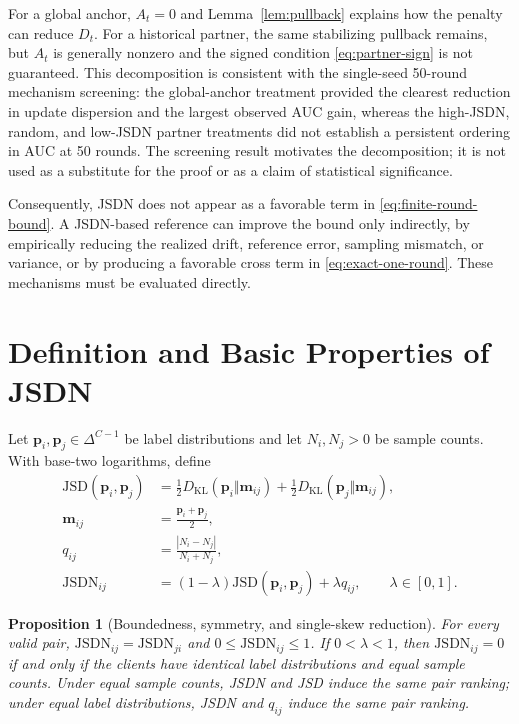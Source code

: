 \documentclass[journal,twoside,web]{ieeecolor}
\newtheorem{proposition}{Proposition}
\newcommand{\JSD}{\mathrm{JSD}}
\newcommand{\JSDN}{\mathrm{JSDN}}
\begin{document}
For a global anchor, $A_t=0$ and Lemma~\ref{lem:pullback} explains how the
penalty can reduce $D_t$. For a historical partner, the same stabilizing
pullback remains, but $A_t$ is generally nonzero and the signed condition
\eqref{eq:partner-sign} is not guaranteed. This decomposition is consistent
with the single-seed 50-round mechanism screening: the global-anchor treatment
provided the clearest reduction in update dispersion and the largest observed
AUC gain, whereas the high-JSDN, random, and low-JSDN partner treatments did
not establish a persistent ordering in AUC at 50 rounds. The screening result
motivates the decomposition; it is not used as a substitute for the proof or
as a claim of statistical significance.

Consequently, JSDN does not appear as a favorable term in
\eqref{eq:finite-round-bound}. A JSDN-based reference can improve the bound
only indirectly, by empirically reducing the realized drift, reference error,
sampling mismatch, or variance, or by producing a favorable cross term in
\eqref{eq:exact-one-round}. These mechanisms must be evaluated directly.

\section{Definition and Basic Properties of JSDN}

Let $\bm p_i,\bm p_j\in\Delta^{C-1}$ be label distributions and let
$N_i,N_j>0$ be sample counts. With base-two logarithms, define
\begin{align}
 \JSD(\bm p_i,\bm p_j)
 &=\frac12D_{\mathrm{KL}}(\bm p_i\Vert\bm m_{ij})
 +\frac12D_{\mathrm{KL}}(\bm p_j\Vert\bm m_{ij}),\\
 \bm m_{ij}&=\frac{\bm p_i+\bm p_j}{2},\\
 q_{ij}&=\frac{|N_i-N_j|}{N_i+N_j},\\
 \JSDN_{ij}&=(1-\lambda)\JSD(\bm p_i,\bm p_j)+\lambda q_{ij},
 \qquad \lambda\in[0,1].
\end{align}

\begin{proposition}[Boundedness, symmetry, and single-skew reduction]
For every valid pair, $\JSDN_{ij}=\JSDN_{ji}$ and
$0\leq\JSDN_{ij}\leq1$. If $0<\lambda<1$, then
$\JSDN_{ij}=0$ if and only if the clients have identical label distributions
and equal sample counts. Under equal sample counts, JSDN and JSD induce the
same pair ranking; under equal label distributions, JSDN and $q_{ij}$ induce
the same pair ranking.
\end{proposition}
\end{document}
